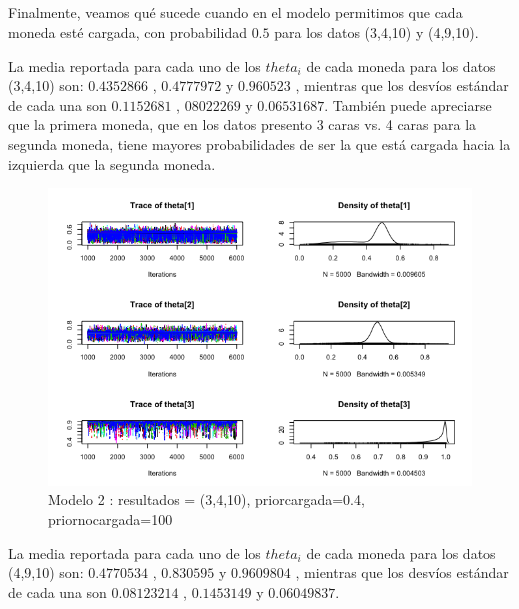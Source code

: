 \documentclass[a4paper]{article}
\begin{document}
\subsection{ }
Finalmente, veamos qué sucede cuando en el modelo permitimos que cada moneda esté cargada, con
probabilidad $0.5$ para los datos (3,4,10) y (4,9,10).

La media reportada para cada uno de los $theta_i$ de cada moneda para los datos (3,4,10) son:
$0.4352866$ , $0.4777972$ y $0.960523$ , mientras que los desvíos estándar de cada una son
$0.1152681$ , $08022269$ y $0.06531687$. También puede apreciarse que la primera moneda, que
en los datos presento 3 caras vs. 4 caras para la segunda moneda, tiene mayores probabilidades
de ser la que está cargada hacia la izquierda que la segunda moneda.

\begin{figure}[h!]
\centering
\includegraphics[scale=0.5] {img7.png}
\caption{ Modelo 2 : resultados = (3,4,10), priorcargada=0.4, priornocargada=100 }
\end{figure}

La media reportada para cada uno de los $theta_i$ de cada moneda para los datos (4,9,10) son:
$0.4770534$ , $0.830595$ y $0.9609804$ , mientras que los desvíos estándar de cada una son
$0.08123214$ , $0.1453149$ y $0.06049837$.
\end{document}

